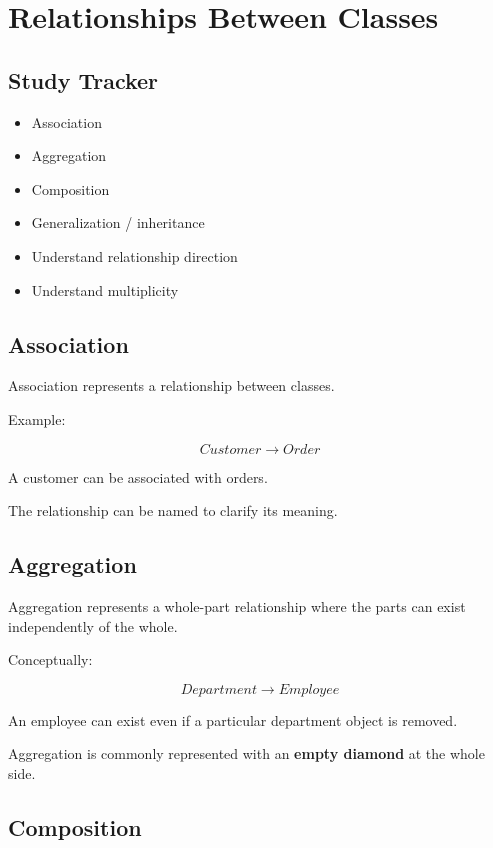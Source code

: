 \documentclass[11pt,a4paper]{article}
\newcommand{\checkitem}{$\square$}
\begin{document}
\section{Relationships Between Classes}

\subsection{Study Tracker}

\begin{itemize}[label=\checkitem]
    \item Association
    \item Aggregation
    \item Composition
    \item Generalization / inheritance
    \item Understand relationship direction
    \item Understand multiplicity
\end{itemize}

\subsection{Association}

Association represents a relationship between classes.

Example:

\[
Customer \longrightarrow Order
\]

A customer can be associated with orders.

The relationship can be named to clarify its meaning.

\subsection{Aggregation}

Aggregation represents a whole-part relationship where the parts can exist
independently of the whole.

Conceptually:

\[
Department \longrightarrow Employee
\]

An employee can exist even if a particular department object is removed.

Aggregation is commonly represented with an \textbf{empty diamond} at the
whole side.

\subsection{Composition}
\end{document}

